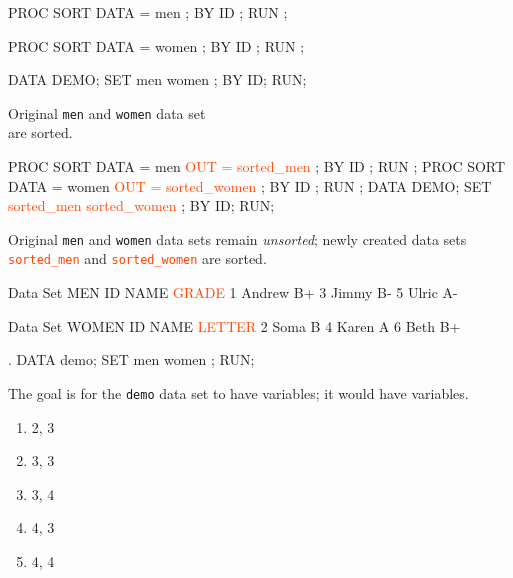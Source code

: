 \begin{frame}[fragile]
\footnotesize
\begin{code}{.0}
PROC SORT DATA = men ;
   BY ID ;
RUN ;

PROC SORT DATA = women ;
   BY ID ;
RUN ;

DATA DEMO;
SET men women ;
BY ID;
RUN;
\end{code}
Original \texttt{men} and \texttt{women} data set \\are sorted.
\vskip40pt
\textcolor{white}{x}
\emp
{}\hspace{1in} \emp
{}
\footnotesize
\begin{code}{.0}
PROC SORT DATA = men
   \textcolor{OrangeRed}{OUT = sorted_men} ;
   BY ID ;
RUN ;
PROC SORT DATA = women
   \textcolor{OrangeRed}{OUT = sorted_women} ;
   BY ID ;
RUN ;
DATA DEMO;
SET \textcolor{OrangeRed}{sorted_men} \textcolor{OrangeRed}{sorted_women} ;
BY ID;
RUN;
\end{code}
Original \texttt{men} and \texttt{women} data sets remain \emph{unsorted}; newly created data sets \textcolor{OrangeRed}{\texttt{sorted\_men}} and \textcolor{OrangeRed}{\texttt{sorted\_women}} are sorted.
\vskip30pt
\textcolor{white}{x}
\emp
\end{frame}

\begin{frame}[fragile]
\footnotesize
\begin{craw}{.1}{Data Set MEN}
ID   NAME     \textcolor{OrangeRed}{GRADE}
1    Andrew     B+
3    Jimmy      B-
5    Ulric      A-
\end{craw}
\vspace{.0in}
\begin{craw}{.1}{Data Set WOMEN}
ID   NAME     \textcolor{OrangeRed}{LETTER}
2    Soma       B
4    Karen      A
6    Beth       B+
\end{craw}
\vspace{.0in}
\emp
{}
\begin{code}{.}
DATA demo;
  SET men women ;
RUN;
\end{code}
\vspace{.0in}
\begin{clicker}{The goal is for the \texttt{demo} data set to have \underline{\hspace{0.3in}} variables; it would have \underline{\hspace{0.3in}} variables.}
\begin{enumerate}
\item 2, 3
\item 3, 3
\item 3, 4
\item 4, 3
\item 4, 4
\end{enumerate}
\end{clicker}
\emp
\vspace{.0in}
\end{frame}


